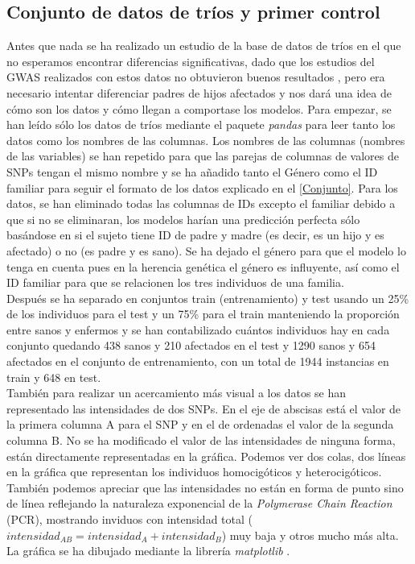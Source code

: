 \subsection{Conjunto de datos de tríos y primer control}
Antes que nada se ha realizado un estudio de la base de datos de tríos en el que no esperamos encontrar diferencias significativas, dado que los estudios del GWAS realizados con estos datos no obtuvieron buenos resultados \cite{szatmari2007mapping}, pero era necesario intentar diferenciar padres de hijos afectados y nos dará una idea de cómo son los datos y cómo llegan a comportase los modelos.
Para empezar, se han leído sólo los datos de tríos mediante el paquete \textit{pandas} \cite{mckinney-proc-scipy-2010} para leer tanto los datos como los nombres de las columnas. Los nombres de las columnas (nombres de las variables) se han repetido para que las parejas de columnas de valores de SNPs tengan el mismo nombre y se ha añadido tanto el Género como el ID familiar para seguir el formato de los datos explicado en el \autoref{Conjunto}. Para los datos, se han eliminado todas las columnas de IDs excepto el familiar debido a que si no se eliminaran, los modelos harían una predicción perfecta sólo basándose en si el sujeto tiene ID de padre y madre (es decir, es un hijo y es afectado) o no (es padre y es sano). Se ha dejado el género para que el modelo lo tenga en cuenta pues en la herencia genética el género es influyente, así como el ID familiar para que se relacionen los tres individuos de una familia.\\
Después se ha separado en conjuntos train (entrenamiento) y test usando un 25\% de los individuos para el test y un 75\% para el train manteniendo la proporción entre sanos y enfermos y se han contabilizado cuántos individuos hay en cada conjunto quedando 438 sanos y 210 afectados en el test y 1290 sanos y 654 afectados en el conjunto de entrenamiento, con un total de 1944 instancias en train y 648 en test.\\
También para realizar un acercamiento más visual a los datos se han representado las intensidades de dos SNPs. En el eje de abscisas está el valor de la primera columna A para el SNP y en el de ordenadas el valor de la segunda columna B. No se ha modificado el valor de las intensidades de ninguna forma, están directamente representadas en la gráfica. Podemos ver dos colas, dos líneas en la gráfica que representan los individuos homocigóticos y heterocigóticos. También podemos apreciar que las intensidades no están en forma de punto sino de línea reflejando la naturaleza exponencial de la \textit{Polymerase Chain Reaction} (PCR), mostrando inviduos con intensidad total ($intensidad_{AB}=intensidad_{A}+intensidad_{B}$) muy baja y otros mucho más alta. La gráfica se ha dibujado mediante la librería \textit{matplotlib} \cite{Hunter:2007}.

